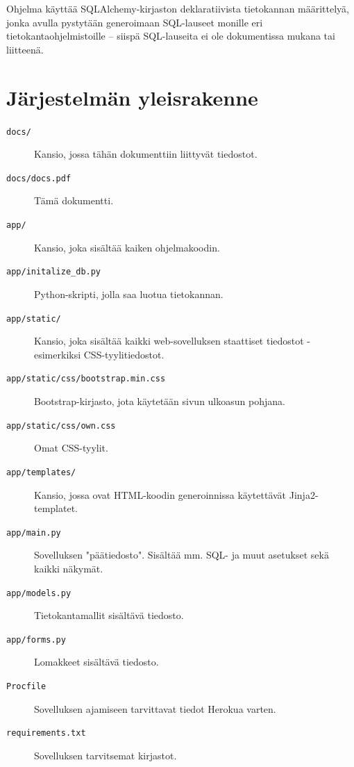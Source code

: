 \documentclass{article}
\let\stdsection\section
\renewcommand\section{\newpage\stdsection}
\begin{document}
Ohjelma käyttää SQLAlchemy-kirjaston deklaratiivista tietokannan määrittelyä, jonka avulla pystytään generoimaan SQL-lauseet monille eri tietokantaohjelmistoille -- siispä SQL-lauseita ei ole dokumentissa mukana tai liitteenä.

\section{Järjestelmän yleisrakenne}

\begin{description}
\item[\texttt{docs/}] Kansio, jossa tähän dokumenttiin liittyvät tiedostot.
\item[\texttt{docs/docs.pdf}] Tämä dokumentti.
\item[\texttt{app/}] Kansio, joka sisältää kaiken ohjelmakoodin.
\item[\texttt{app/initalize\_db.py}] Python-skripti, jolla saa luotua tietokannan.
\item[\texttt{app/static/}] Kansio, joka sisältää kaikki web-sovelluksen staattiset tiedostot - esimerkiksi CSS-tyylitiedostot.
\item[\texttt{app/static/css/bootstrap.min.css}] Bootstrap-kirjasto, jota käytetään sivun ulkoasun pohjana.
\item[\texttt{app/static/css/own.css}] Omat CSS-tyylit.
\item[\texttt{app/templates/}] Kansio, jossa ovat HTML-koodin generoinnissa käytettävät Jinja2-templatet.
\item[\texttt{app/main.py}] Sovelluksen "päätiedosto". Sisältää mm. SQL- ja muut asetukset sekä kaikki näkymät.
\item[\texttt{app/models.py}] Tietokantamallit sisältävä tiedosto.
\item[\texttt{app/forms.py}] Lomakkeet sisältävä tiedosto.
\item[\texttt{Procfile}] Sovelluksen ajamiseen tarvittavat tiedot Herokua varten.
\item[\texttt{requirements.txt}] Sovelluksen tarvitsemat kirjastot.
\end{description}
\end{document}

